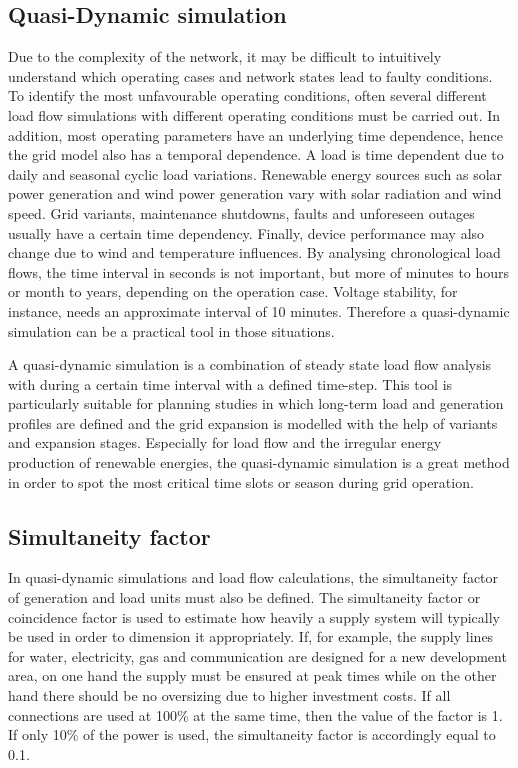 
\subsection{Quasi-Dynamic simulation}

Due to the complexity of the network, it may be difficult to intuitively understand which operating cases and network states lead to faulty conditions. To identify the most unfavourable operating conditions, often several different load flow simulations with different operating conditions must be carried out. In addition, most operating parameters have an underlying time dependence, hence the grid model also has a temporal dependence. A load is time dependent due to daily and seasonal cyclic load variations. Renewable energy sources such as solar power generation and wind power generation vary with solar radiation and wind speed. Grid variants, maintenance shutdowns, faults and unforeseen outages usually have a certain time dependency. Finally, device performance may also change due to wind and temperature influences. By analysing chronological load flows, the time interval in seconds is not important, but more of minutes to hours or month to years, depending on the operation case. Voltage stability, for instance, needs an approximate interval of 10 minutes. Therefore a quasi-dynamic simulation can be a practical tool in those situations. 

A quasi-dynamic simulation is a combination of steady state load flow analysis with during a certain time interval with a defined time-step. This tool is particularly suitable for planning studies in which long-term load and generation profiles are defined and the grid expansion is modelled with the help of variants and expansion stages. Especially for load flow and the irregular energy production of renewable energies, the quasi-dynamic simulation is a great method in order to spot the most critical time slots or season during grid operation.  

\subsection{Simultaneity factor}

In quasi-dynamic simulations and load flow calculations, the simultaneity factor of generation and load units must also be defined. The simultaneity factor or coincidence factor is used to estimate how heavily a supply system will typically be used in order to dimension it appropriately. If, for example, the supply lines for water, electricity, gas and communication are designed for a new development area, on one hand the supply must be ensured at peak times while on the other hand there should be no oversizing due to higher investment costs. If all connections are used at 100\% at the same time, then the value of the factor is 1. If only 10\% of the power is used, the simultaneity factor is accordingly equal to 0.1.

